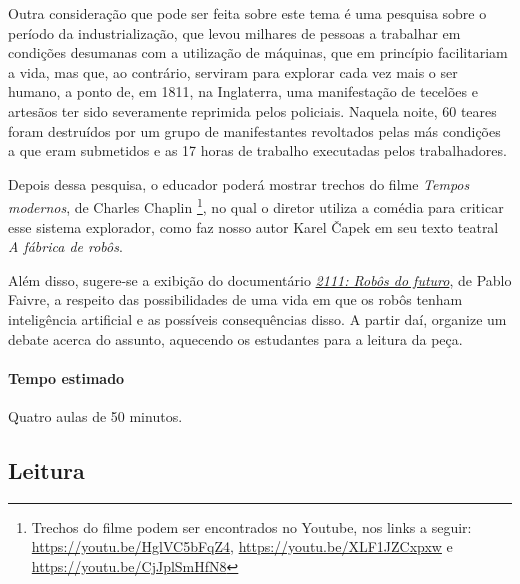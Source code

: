 \documentclass[11pt]{extarticle}
\begin{document}


Outra consideração que pode ser feita sobre este tema é uma pesquisa sobre o período da industrialização, que levou milhares de pessoas a trabalhar em condições desumanas com a utilização de máquinas, que em princípio facilitariam a vida, mas que, ao contrário, serviram para explorar cada vez mais o ser humano, a ponto de, em 1811, na Inglaterra, uma manifestação de tecelões e artesãos ter sido severamente reprimida pelos policiais. Naquela noite, 60 teares foram destruídos por um grupo de manifestantes revoltados pelas más condições a que eram submetidos e as 17 horas de trabalho executadas pelos trabalhadores. 

Depois dessa pesquisa, o educador poderá mostrar trechos do filme \textit{Tempos modernos}, de Charles Chaplin \footnote{Trechos do filme podem ser encontrados no Youtube, nos links a seguir: \url{https://youtu.be/HglVC5bFqZ4}, \url{https://youtu.be/XLF1JZCxpxw} e \url{https://youtu.be/CjJplSmHfN8}}, no qual o diretor utiliza a comédia para criticar esse sistema explorador, como faz nosso autor Karel Čapek em seu texto teatral \textit{A fábrica de robôs}. 


Além disso, sugere-se a exibição do documentário \href{https://www.youtube.com/watch?v=gtUtczmJmO4}{\textit{2111: Robôs do futuro}}, de Pablo Faivre, a respeito das possibilidades de uma vida em que os robôs tenham inteligência artificial e as possíveis consequências disso. A partir daí, organize um debate acerca do assunto, aquecendo os estudantes para a leitura da peça.

\paragraph{Tempo estimado} Quatro aulas de 50 minutos. 

\subsection{Leitura}

\end{document}

